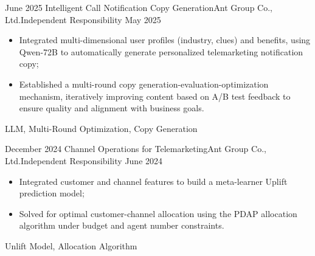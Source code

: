 \begin{experiences}
  \emptySeparator
  \experience
  {June 2025} {Intelligent Call Notification Copy Generation}{Ant Group Co., Ltd.}{Independent Responsibility}
  {May 2025 }    {
				  	\begin{itemize}
				  		\item Integrated multi-dimensional user profiles (industry, clues) and benefits, using Qwen-72B to automatically generate personalized telemarketing notification copy;
				  		\item Established a multi-round copy generation-evaluation-optimization mechanism, iteratively improving content based on A/B test feedback to ensure quality and alignment with business goals.
				  	\end{itemize}
				  }
				  {LLM, Multi-Round Optimization, Copy Generation}

  \emptySeparator
  \experience
  {December 2024} {Channel Operations for Telemarketing}{Ant Group Co., Ltd.}{Independent Responsibility}
  {June 2024}    {
  	\begin{itemize}
  		\item  Integrated customer and channel features to build a meta-learner Uplift prediction model;
  		\item  Solved for optimal customer-channel allocation using the PDAP allocation algorithm under budget and agent number constraints.
  	\end{itemize}
  }
  {Unlift Model, Allocation Algorithm}
  	


\end{experiences}
